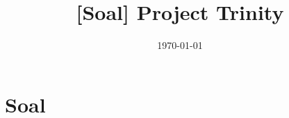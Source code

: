 

\title{[Soal] Project Trinity}
\date{\today}



\maketitle

\renewcommand*\contentsname{Daftar Isi}
\tableofcontents

\newpage
\section{Soal}


